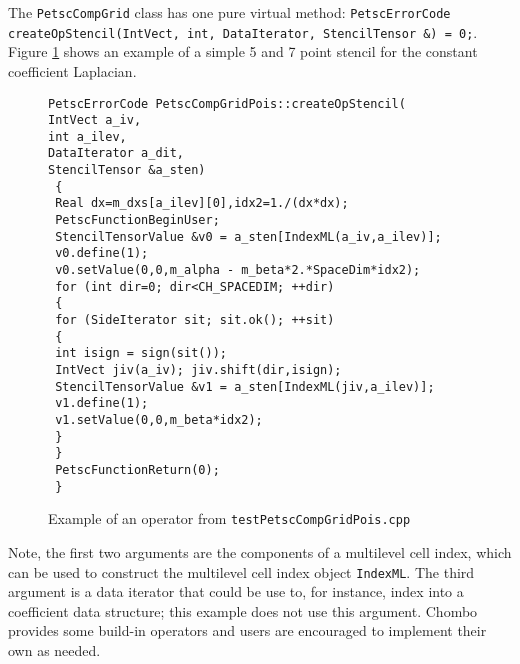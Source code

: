 The \texttt{PetscCompGrid} class has one pure virtual method: \texttt{PetscErrorCode createOpStencil(IntVect, int, DataIterator, StencilTensor \&) = 0;}.
Figure \ref{fig:petsc_op} shows an example of a simple 5 and 7 point stencil for the constant coefficient Laplacian. 
\begin{figure}[h]
\begin{flushleft}
\texttt{PetscErrorCode PetscCompGridPois::createOpStencil( } \\
\texttt{\phantom{MMMM}IntVect a\_iv, } \\
\texttt{\phantom{MMMM}int a\_ilev, } \\
\texttt{\phantom{MMMM}DataIterator a\_dit, } \\
\texttt{\phantom{MMMM}StencilTensor \&a\_sten)} \\
\texttt{ \{} \\
\texttt{\phantom{MMMM}  Real dx=m\_dxs[a\_ilev][0],idx2=1./(dx*dx);} \\
\texttt{\phantom{MMMM}  PetscFunctionBeginUser;} \\
\texttt{\phantom{MMMM}  StencilTensorValue \&v0 = a\_sten[IndexML(a\_iv,a\_ilev)]; } \\
\texttt{\phantom{MMMM}  v0.define(1);} \\
\texttt{\phantom{MMMM}  v0.setValue(0,0,m\_alpha - m\_beta*2.*SpaceDim*idx2);} \\
\texttt{\phantom{MMMM}  for (int dir=0; dir<CH\_SPACEDIM; ++dir)} \\
\texttt{\phantom{MMMMMM}  \{} \\
\texttt{\phantom{MMMMMMMM}       for (SideIterator sit; sit.ok(); ++sit)} \\
\texttt{\phantom{MMMMMMMM} \{} \\
\texttt{\phantom{MMMMMMMMMM} int isign = sign(sit());} \\
\texttt{\phantom{MMMMMMMMMM} IntVect jiv(a\_iv); jiv.shift(dir,isign);} \\
\texttt{\phantom{MMMMMMMMMM} StencilTensorValue \&v1 = a\_sten[IndexML(jiv,a\_ilev)]; } \\
\texttt{\phantom{MMMMMMMMMM} v1.define(1);} \\
\texttt{\phantom{MMMMMMMMMM} v1.setValue(0,0,m\_beta*idx2);} \\
\texttt{\phantom{MMMMMMMM}  \}} \\
\texttt{\phantom{MMMMMM}  \} } \\
\texttt{\phantom{MMMM} PetscFunctionReturn(0);} \\
\texttt{ \}} \\
\caption{Example of an operator from \texttt{testPetscCompGridPois.cpp}}
\label{fig:petsc_op}
\end{flushleft}
\end{figure}
Note, the first two arguments are the components of a multilevel cell index, which can be used to construct the multilevel cell index object \texttt{IndexML}.
The third argument is a data iterator that could be use to, for instance, index into a coefficient data structure; this example does not use this argument.
Chombo provides some build-in operators and users are encouraged to implement their own as needed.

